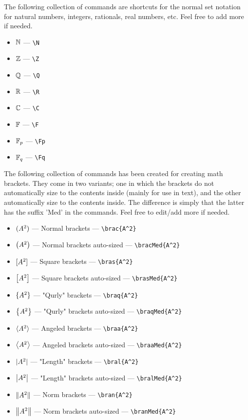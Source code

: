 \documentclass[../thesis.tex]{subfiles}
\begin{document}
The following collection of commands are shortcuts for the normal set notation for natural numbers, integers, rationals, real numbers, etc. Feel free to add more if needed.
\begin{itemize}
    \item {$\mathbb{N}$} — \verb|\N|
    \item {$\mathbb{Z}$} — \verb|\Z|
    \item {$\mathbb{Q}$} — \verb|\Q|
    \item {$\mathbb{R}$} — \verb|\R|
    \item {$\mathbb{C}$} — \verb|\C|
    \item {$\mathbb{F}$} — \verb|\F|
    \item {$\mathbb{F}_p$} — \verb|\Fp|
    \item {$\mathbb{F}_q$} — \verb|\Fq|
\end{itemize}

The following collection of commands has been created for creating math brackets. They come in two variants; one in which the brackets do not automatically size to the contents inside (mainly for use in text), and the other automatically size to the contents inside. The difference is simply that the latter has the suffix 'Med' in the commands. Feel free to edit/add more if needed.
\begin{itemize}
    \item{$(A^2)$} — Normal brackets — \verb|\brac{A^2}|
    \item{$\left(A^2\right)$} — Normal brackets auto-sized — \verb|\bracMed{A^2}|
    \item{$[A^2]$} — Square brackets — \verb|\bras{A^2}|
    \item{$\left[A^2\right]$} — Square brackets auto-sized — \verb|\brasMed{A^2}|
    \item{$\{A^2\}$} — "Qurly" brackets — \verb|\braq{A^2}|
    \item{$\left\{A^2\right\}$} — "Qurly" brackets auto-sized — \verb|\braqMed{A^2}|
    \item{$\langle A^2\rangle$} — Angeled brackets — \verb|\braa{A^2}|
    \item{$\left \langle A^2 \right \rangle$} — Angeled brackets auto-sized — \verb|\braaMed{A^2}|
    \item{$|A^2|$} — "Length" brackets — \verb|\bral{A^2}|
    \item{$\left|A^2\right|$} — "Length" brackets auto-sized — \verb|\bralMed{A^2}|
    \item{$\|A^2\|$} — Norm brackets — \verb|\bran{A^2}|
    \item{$\left \|A^2\right \|$} — Norm brackets auto-sized — \verb|\branMed{A^2}|
\end{itemize}
\end{document}
